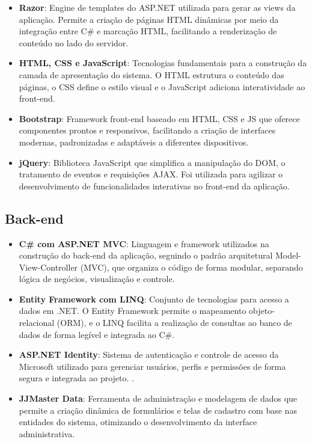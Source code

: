 \documentclass[
	12pt,				%
	openright,			%
	twoside,			%
	a4paper,			%
	english,			%
	french,				%
	spanish,			%
	brazil				%
	]{abntex2}
\begin{document}
\begin{itemize}

   \item \textbf{Razor}: Engine de templates do ASP.NET utilizada para gerar as views da aplicação. Permite a criação de páginas HTML dinâmicas por meio da integração entre C\# e marcação HTML, facilitando a renderização de conteúdo no lado do servidor.

   \item \textbf{HTML, CSS e JavaScript}: Tecnologias fundamentais para a construção da camada de apresentação do sistema. O HTML estrutura o conteúdo das páginas, o CSS define o estilo visual e o JavaScript adiciona interatividade ao front-end.

   \item \textbf{Bootstrap}: Framework front-end baseado em HTML, CSS e JS que oferece componentes prontos e responsivos, facilitando a criação de interfaces modernas, padronizadas e adaptáveis a diferentes dispositivos.

   \item \textbf{jQuery}: Biblioteca JavaScript que simplifica a manipulação do DOM, o tratamento de eventos e requisições AJAX. Foi utilizada para agilizar o desenvolvimento de funcionalidades interativas no front-end da aplicação.

\end{itemize}


\subsection{Back-end}

\begin{itemize}

  \item \textbf{C\# com ASP.NET MVC}: Linguagem e framework utilizados na construção do back-end da aplicação, seguindo o padrão arquitetural Model-View-Controller (MVC), que organiza o código de forma modular, separando lógica de negócios, visualização e controle.

  \item \textbf{Entity Framework com LINQ}: Conjunto de tecnologias para acesso a dados em .NET. O Entity Framework permite o mapeamento objeto-relacional (ORM), e o LINQ facilita a realização de consultas ao banco de dados de forma legível e integrada ao C\#.

  \item \textbf{ASP.NET Identity}: Sistema de autenticação e controle de acesso da Microsoft utilizado para gerenciar usuários, perfis e permissões de forma segura e integrada ao projeto. \cite{AspNet2025}.

  \item \textbf{JJMaster Data}: Ferramenta de administração e modelagem de dados que permite a criação dinâmica de formulários e telas de cadastro com base nas entidades do sistema, otimizando o desenvolvimento da interface administrativa.

\end{itemize}
\end{document}
